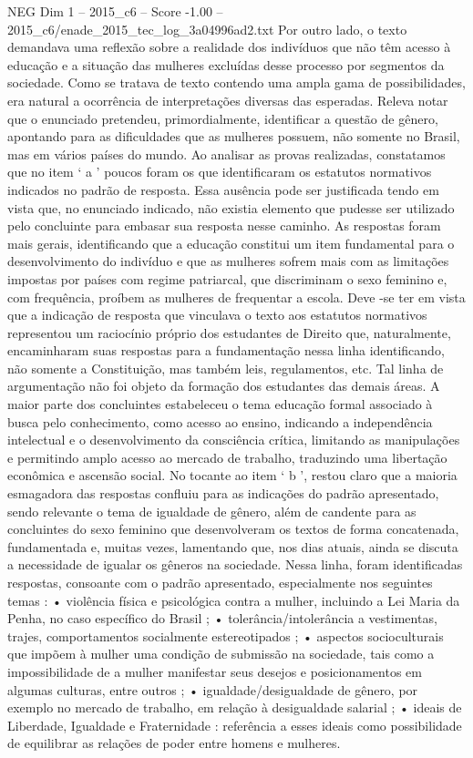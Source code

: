 \begin{textsample}{NEG Dim 1 – 2015\_c6 – Score -1.00 – 2015\_c6/enade\_2015\_tec\_log\_3a04996ad2.txt}
Por outro lado, o texto demandava uma reflexão sobre a realidade dos indivíduos que não têm acesso à educação e a situação das mulheres excluídas desse processo por segmentos da sociedade.
Como se tratava de texto contendo uma ampla gama de possibilidades, era natural a ocorrência de interpretações diversas das esperadas.
Releva notar que o enunciado pretendeu, primordialmente, identificar a questão de gênero, apontando para as dificuldades que as mulheres possuem, não somente no Brasil, mas em vários países do mundo.
Ao analisar as provas realizadas, constatamos que no item ‘ a ’ poucos foram os que identificaram os estatutos normativos indicados no padrão de resposta.
Essa ausência pode ser justificada tendo em vista que, no enunciado indicado, não existia elemento que pudesse ser utilizado pelo concluinte para embasar sua resposta nesse caminho.
As respostas foram mais gerais, identificando que a educação constitui um item fundamental para o desenvolvimento do indivíduo e que as mulheres sofrem mais com as limitações impostas por países com regime patriarcal, que discriminam o sexo feminino e, com frequência, proíbem as mulheres de frequentar a escola.
Deve -se ter em vista que a indicação de resposta que vinculava o texto aos estatutos normativos representou um raciocínio próprio dos estudantes de Direito que, naturalmente, encaminharam suas respostas para a fundamentação nessa linha identificando, não somente a Constituição, mas também leis, regulamentos, etc.
Tal linha de argumentação não foi objeto da formação dos estudantes das demais áreas.
A maior parte dos concluintes estabeleceu o tema educação formal associado à busca pelo conhecimento, como acesso ao ensino, indicando a independência intelectual e o desenvolvimento da consciência crítica, limitando as manipulações e permitindo amplo acesso ao mercado de trabalho, traduzindo uma libertação econômica e ascensão social.
No tocante ao item ‘ b ’, restou claro que a maioria esmagadora das respostas confluiu para as indicações do padrão apresentado, sendo relevante o tema de igualdade de gênero, além de candente para as concluintes do sexo feminino que desenvolveram os textos de forma concatenada, fundamentada e, muitas vezes, lamentando que, nos dias atuais, ainda se discuta a necessidade de igualar os gêneros na sociedade.
Nessa linha, foram identificadas respostas, consoante com o padrão apresentado, especialmente nos seguintes temas : • violência física e psicológica contra a mulher, incluindo a Lei Maria da Penha, no caso específico do Brasil ; • tolerância/intolerância a vestimentas, trajes, comportamentos socialmente estereotipados ; • aspectos socioculturais que impõem à mulher uma condição de submissão na sociedade, tais como a impossibilidade de a mulher manifestar seus desejos e posicionamentos em algumas culturas, entre outros ; • igualdade/desigualdade de gênero, por exemplo no mercado de trabalho, em relação à desigualdade salarial ; • ideais de Liberdade, Igualdade e Fraternidade : referência a esses ideais como possibilidade de equilibrar as relações de poder entre homens e mulheres.

\end{textsample}
